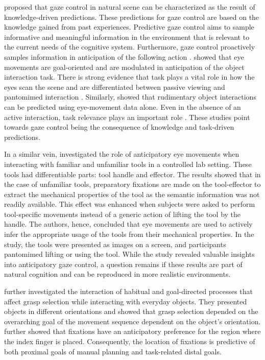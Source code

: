 \citet{Henderson2017-tx} proposed that gaze control in natural scene can be characterized as the result of knowledge-driven predictions. These predictions for gaze control are based on the knowledge gained from past experiences. Predictive gaze control aims to sample informative and meaningful information in the environment that is relevant to the current needs of the cognitive system. Furthermore, gaze control proactively samples information in anticipation of the following action \citep{Hayhoe2004-ni, Land2001-do, Pelz2001-cn}. \citet{Belardinelli2016-kf}  showed that eye movements are goal-oriented and are modulated in anticipation of the object interaction task. There is strong evidence that task plays a vital role in how the eyes scan the scene and are differentiated between passive viewing and pantomimed interaction \citep{Belardinelli2015-in}. Similarly, \citet{Keshava2020-cp} showed that rudimentary object interactions can be predicted using eye-movement data alone. Even in the absence of an active interaction, task relevance plays an important role \citep{Castelhano2009-px, Henderson2017-it}. These studies point towards gaze control being the consequence of knowledge and task-driven predictions.

In a similar vein, \citet{Belardinelli2016-xb} investigated the role of anticipatory eye movements when interacting with familiar and unfamiliar tools in a controlled lab setting. These tools had differentiable parts: tool handle and effector. The results showed that in the case of unfamiliar tools, preparatory fixations are made on the tool-effector to extract the mechanical properties of the tool as the semantic information was not readily available. This effect was enhanced when subjects were asked to perform tool-specific movements instead of a generic action of lifting the tool by the handle. The authors, hence, concluded that eye movements are used to actively infer the appropriate usage of the tools from their mechanical properties. In the study, the tools were presented as images on a screen, and participants pantomimed lifting or using the tool. While the study revealed valuable insights into anticipatory gaze control, a question remains if these results are part of natural cognition and can be reproduced in more realistic environments.

\citet{Herbort2011-hf}  further investigated the interaction of habitual and goal-directed processes that affect grasp selection while interacting with everyday objects. They presented objects in different orientations and showed that grasp selection depended on the overarching goal of the movement sequence dependent on the object’s orientation. \citet{Belardinelli2016-kf} further showed that fixations have an anticipatory preference for the region where the index finger is placed. Consequently, the location of fixations is predictive of both proximal goals of manual planning and task-related distal goals.

